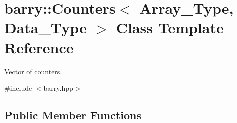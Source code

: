 \hypertarget{classbarry_1_1_counters}{}\section{barry\+:\+:Counters$<$ Array\+\_\+\+Type, Data\+\_\+\+Type $>$ Class Template Reference}
\label{classbarry_1_1_counters}


Vector of counters.  




{\ttfamily \#include $<$barry.\+hpp$>$}

\subsection*{Public Member Functions}
